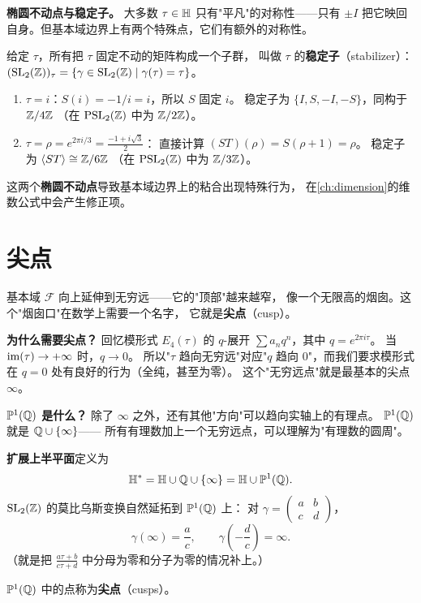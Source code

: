 \textbf{椭圆不动点与稳定子。}
\label{rem:elliptic-fixed-points}
大多数 $\tau \in \mathbb{H}$ 只有"平凡"的对称性——只有 $\pm I$
把它映回自身。但基本域边界上有两个特殊点，它们有额外的对称性。

给定 $\tau$，所有把 $\tau$ 固定不动的矩阵构成一个子群，
叫做 $\tau$ 的\textbf{稳定子}（stabilizer）：
$(\mathrm{SL}_2(\mathbb{Z}))_\tau = \{\gamma \in \mathrm{SL}_2(\mathbb{Z}) \mid \gamma(\tau) = \tau\}$。

\begin{enumerate}
  \item $\tau = i$：$S(i) = -1/i = i$，所以 $S$ 固定 $i$。
    稳定子为 $\{I, S, -I, -S\}$，同构于 $\mathbb{Z}/4\mathbb{Z}$
    （在 $\mathrm{PSL}_2(\mathbb{Z})$ 中为 $\mathbb{Z}/2\mathbb{Z}$）。
  \item $\tau = \rho = e^{2\pi i/3} = \frac{-1+i\sqrt{3}}{2}$：
    直接计算 $(ST)(\rho) = S(\rho + 1) = \rho$。
    稳定子为 $\langle ST \rangle \cong \mathbb{Z}/6\mathbb{Z}$
    （在 $\mathrm{PSL}_2(\mathbb{Z})$ 中为 $\mathbb{Z}/3\mathbb{Z}$）。
\end{enumerate}
这两个\textbf{椭圆不动点}导致基本域边界上的粘合出现特殊行为，
在\cref{ch:dimension}的维数公式中会产生修正项。


\section{尖点}
\label{sec:cusps}

基本域 $\mathcal{F}$ 向上延伸到无穷远——它的"顶部"越来越窄，
像一个无限高的烟囱。这个"烟囱口"在数学上需要一个名字，
它就是\textbf{尖点}（cusp）。

\textbf{为什么需要尖点？}
回忆模形式 $E_4(\tau)$ 的 $q$-展开 $\sum a_n q^n$，其中 $q = e^{2\pi i\tau}$。
当 $\operatorname{im}(\tau) \to +\infty$ 时，$q \to 0$。
所以"$\tau$ 趋向无穷远"对应"$q$ 趋向 $0$"，而我们要求模形式在 $q = 0$
处有良好的行为（全纯，甚至为零）。
这个"无穷远点"就是最基本的尖点 $\infty$。

\textbf{$\mathbb{P}^1(\mathbb{Q})$ 是什么？}
除了 $\infty$ 之外，还有其他"方向"可以趋向实轴上的有理点。
$\mathbb{P}^1(\mathbb{Q})$ 就是 $\mathbb{Q} \cup \{\infty\}$——
所有有理数加上一个无穷远点，可以理解为"有理数的圆周"。

\begin{definition}[扩展上半平面与尖点]
\label{def:cusps}
\textbf{扩展上半平面}定义为
\[
  \mathbb{H}^* = \mathbb{H} \cup \mathbb{Q} \cup \{\infty\} = \mathbb{H} \cup \mathbb{P}^1(\mathbb{Q}).
\]
$\mathrm{SL}_2(\mathbb{Z})$ 的莫比乌斯变换自然延拓到 $\mathbb{P}^1(\mathbb{Q})$ 上：
对 $\gamma = \begin{pmatrix} a & b \\ c & d \end{pmatrix}$，
\[
  \gamma(\infty) = \frac{a}{c}, \qquad
  \gamma\!\left(-\frac{d}{c}\right) = \infty.
\]
（就是把 $\frac{a\tau + b}{c\tau + d}$ 中分母为零和分子为零的情况补上。）

$\mathbb{P}^1(\mathbb{Q})$ 中的点称为\textbf{尖点}（cusps）。
\end{definition}

